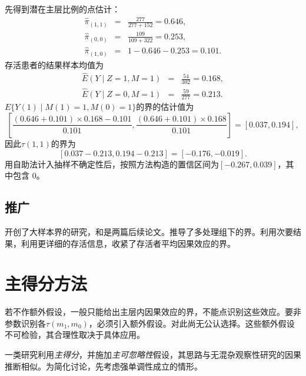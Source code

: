 
先得到潜在主层比例的点估计：
\begin{eqnarray*} 
 \hat{\pi}_{(1,1)} &=& \frac{277}{277+152} = 0.646, \\
  \hat{\pi}_{(0,0)} &=&  \frac{109}{109+322} = 0.253,  \\ 
\hat{\pi}_{(1,0)} &=& 1 -0.646 -  0.253 =   0.101. 
\end{eqnarray*}
存活患者的结果样本均值为
\begin{eqnarray*} 
\hat{E}(Y\mid Z=1,M=1) &=& \frac{54}{302} = 0.168, \\ 
\hat{E}(Y\mid Z=0, M=1) &=& \frac{59}{277} = 0.213.
\end{eqnarray*}
$E\{  Y(1)\mid   M(1)=1, M(0)=1 \}$的界的估计值为
$$
\left[ \frac{  ( 0.646 + 0.101 )\times  0.168-  0.101 }{  0.101 },  
\frac{ ( 0.646 + 0.101 )\times  0.168}{0.101} \right]
= [  0.037, 0.194],
$$
因此$\tau(1,1)$的界为
$$
[0.037- 0.213, 0.194- 0.213] = 
[  -0.176, -0.019 ] . 
$$
用自助法计入抽样不确定性后，按照\citet{imbens2004confidence}方法构造的置信区间为$[-0.267,  0.039]$，其中包含 0。




\subsection{推广}


\citet{zhang2003estimation}开创了大样本界的研究，\citet{imai2008sharp}和\citet{lee2009training}是两篇后续论文。\citet{cheng2006bounds}推导了多处理组下的界。\citet{yang2016using}利用次要结果，\citet{yang2018using}利用更详细的存活信息，收紧了存活者平均因果效应的界。 

 
 
 
\section{主得分方法} 
 
 
 
 
若不作额外假设，一般只能给出主层内因果效应的界，不能点识别这些效应。要非参数识别各$\tau(m_1, m_0)$，必须引入额外假设。对此尚无公认选择。这些额外假设不可检验，其合理性取决于具体应用。 

一类研究利用{\it 主得分}，并施加{\it 主可忽略性}假设，其思路与无混杂观察性研究的因果推断相似。为简化讨论，先考虑强单调性成立的情形。 



